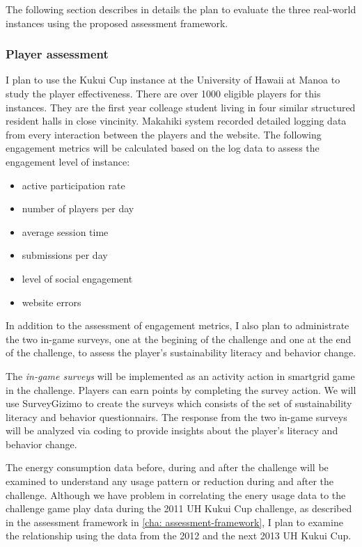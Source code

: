 The following section describes in details the plan to evaluate the three real-world instances using the proposed assessment framework.

\subsubsection{Player assessment}

I plan to use the Kukui Cup instance at the University of Hawaii at Manoa to study the player effectiveness. There are over 1000 eligible players for this instances. They are the first year colleage student living in four similar structured resident halls in close vincinity. Makahiki system recorded detailed logging data from every interaction between the players and the website. The following engagement metrics will be calculated based on the log data to assess the engagement level of instance:

\begin{itemize}
\item active participation rate
\item number of players per day
\item average session time
\item submissions per day
\item level of social engagement
\item website errors
\end{itemize}

In addition to the assessment of engagement metrics, I also plan to administrate the two in-game surveys, one at the begining of the challenge and one at the end of the challenge, to assess the player's sustainability literacy and behavior change.

The \emph{in-game surveys} will be implemented as an activity action in smartgrid game in the challenge. Players can earn points by completing the survey action. We will use SurveyGizimo to create the surveys which consists of the set of sustainability literacy and behavior questionnairs. The response from the two in-game surveys will be analyzed via coding to provide insights about the player's literacy and behavior change.

The energy consumption data before, during and after the challenge will be examined to understand any usage pattern or reduction during and after the challenge. Although we have problem in correlating the enery usage data to the challenge game play data during the 2011 UH Kukui Cup challenge, as described in the assessment framework in \autoref{cha: assessment-framework}, I plan to examine the relationship using the data from the 2012 and the next 2013 UH Kukui Cup.

